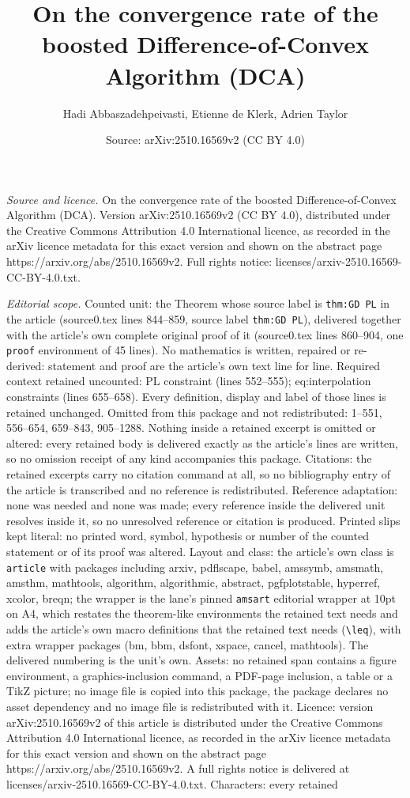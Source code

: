 \documentclass[10pt,a4paper]{amsart}
\title[On the convergence rate of the boosted Difference-of-Convex ]{On the convergence rate of the boosted Difference-of-Convex Algorithm (DCA)}
\author{Hadi Abbaszadehpeivasti, Etienne de Klerk, Adrien Taylor}
\date{Source: arXiv:2510.16569v2 (CC BY 4.0)}
\begin{document}
\maketitle

\noindent\emph{Source and licence.} On the convergence rate of the boosted Difference-of-Convex Algorithm (DCA). Version arXiv:2510.16569v2 (CC BY 4.0), distributed under the Creative Commons Attribution 4.0 International licence, as recorded in the arXiv licence metadata for this exact version and shown on the abstract page https://arxiv.org/abs/2510.16569v2. Full rights notice: licenses/arxiv-2510.16569-CC-BY-4.0.txt.\par\smallskip

\noindent\textit{Editorial scope.} Counted unit: the Theorem whose source label is \texttt{thm:GD PL} in the article (source0.tex lines 844--859, source label \texttt{thm:GD PL}), delivered together with the article's own complete original proof of it (source0.tex lines 860--904, one \texttt{proof} environment of 45 lines). No mathematics is written, repaired or re-derived: statement and proof are the article's own text line for line. Required context retained uncounted: PL constraint (lines 552--555); eq:interpolation constraints (lines 655--658). Every definition, display and label of those lines is retained unchanged. Omitted from this package and not redistributed: 1--551, 556--654, 659--843, 905--1288. Nothing inside a retained excerpt is omitted or altered: every retained body is delivered exactly as the article's lines are written, so no omission receipt of any kind accompanies this package. Citations: the retained excerpts carry no citation command at all, so no bibliography entry of the article is transcribed and no reference is redistributed. Reference adaptation: none was needed and none was made; every reference inside the delivered unit resolves inside it, so no unresolved reference or citation is produced. Printed slips kept literal: no printed word, symbol, hypothesis or number of the counted statement or of its proof was altered. Layout and class: the article's own class is \texttt{article} with packages including arxiv, pdflscape, babel, amssymb, amsmath, amsthm, mathtools, algorithm, algorithmic, abstract, pgfplotstable, hyperref, xcolor, breqn; the wrapper is the lane's pinned \texttt{amsart} editorial wrapper at 10pt on A4, which restates the theorem-like environments the retained text needs and adds the article's own macro definitions that the retained text needs (\texttt{\textbackslash leq}), with extra wrapper packages (bm, bbm, dsfont, xspace, cancel, mathtools). The delivered numbering is the unit's own. Assets: no retained span contains a figure environment, a graphics-inclusion command, a PDF-page inclusion, a table or a TikZ picture; no image file is copied into this package, the package declares no asset dependency and no image file is redistributed with it. Licence: version arXiv:2510.16569v2 of this article is distributed under the Creative Commons Attribution 4.0 International licence, as recorded in the arXiv licence metadata for this exact version and shown on the abstract page https://arxiv.org/abs/2510.16569v2. A full rights notice is delivered at licenses/arxiv-2510.16569-CC-BY-4.0.txt. Characters: every retained 
\end{document}
